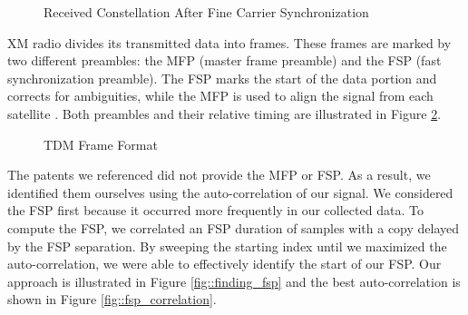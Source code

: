 \documentclass[conference,onecolumn]{IEEEtran}
\begin{document}
\begin{figure}[H]
	\centerline{}
	\caption{Received Constellation After Fine Carrier Synchronization}
	\label{fig::constellation_after_fine_carrier_comp}
\end{figure}

XM radio divides its transmitted data into frames. These frames are marked by two different preambles: the MFP (master frame preamble) and the FSP (fast synchronization preamble). The FSP marks the start of the data portion and corrects for ambiguities, while the MFP is used to align the signal from each satellite \cite{a2008_us8260192b2}. Both preambles and their relative timing are illustrated in Figure \ref{fig::tdm_frame_format}.

\begin{figure}[H]
	\centerline{}
	\caption{TDM Frame Format \cite{a2008_us8260192b2}}
	\label{fig::tdm_frame_format}
\end{figure}

The patents we referenced did not provide the MFP or FSP. As a result, we identified them ourselves using the auto-correlation of our signal. We considered the FSP first because it occurred more frequently in our collected data. To compute the FSP, we correlated an FSP duration of samples with a copy delayed by the FSP separation. By sweeping the starting index until we maximized the auto-correlation, we were able to effectively identify the start of our FSP. Our approach is illustrated in Figure \ref{fig::finding_fsp} and the best auto-correlation is shown in Figure \ref{fig::fsp_correlation}.
\end{document}
